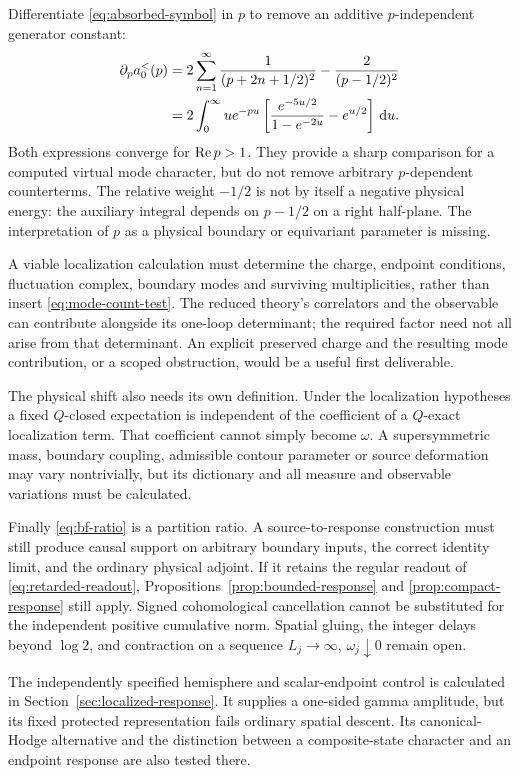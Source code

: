 Differentiate \eqref{eq:absorbed-symbol} in $p$ to remove
an additive $p$-independent generator constant:
\begin{align}\label{eq:mode-count-test}
 \partial_p a_0^{<}(p)
 &=2\sum_{n=1}^\infty\frac1{(p+2n+1/2)^2}
   -\frac2{(p-1/2)^2}\\
 &=2\int_0^\infty u e^{-pu}
 \left[\frac{e^{-5u/2}}{1-e^{-2u}}-e^{u/2}\right]\,\mathrm d u.
 \notag
\end{align}
Both expressions converge for $\operatorname{Re} p>1$. They provide a
sharp comparison for a computed virtual mode character,
but do not remove arbitrary $p$-dependent counterterms.
The relative weight $-1/2$ is not by itself a negative
physical energy: the auxiliary integral depends on
$p-1/2$ on a right half-plane. The interpretation of $p$
as a physical boundary or equivariant parameter is missing.

A viable localization calculation must determine the
charge, endpoint conditions, fluctuation complex, boundary
modes and surviving multiplicities, rather than insert
\eqref{eq:mode-count-test}. The reduced theory's correlators
and the observable can contribute alongside its one-loop
determinant; the required factor need not all arise from
that determinant. An explicit preserved charge and the
resulting mode contribution, or a scoped obstruction,
would be a useful first deliverable.

The physical shift also needs its own definition. Under
the localization hypotheses a fixed $Q$-closed expectation
is independent of the coefficient of a $Q$-exact
localization term. That coefficient cannot simply become
$\omega$. A supersymmetric mass, boundary coupling,
admissible contour parameter or source deformation may
vary nontrivially, but its dictionary and all measure and
observable variations must be calculated.

Finally \eqref{eq:bf-ratio} is a partition ratio. A
source-to-response construction must still produce causal
support on arbitrary boundary inputs, the correct identity
limit, and the ordinary physical adjoint. If it retains
the regular readout of \eqref{eq:retarded-readout},
Propositions~\ref{prop:bounded-response} and
\ref{prop:compact-response} still apply.
Signed cohomological cancellation cannot be substituted
for the independent positive cumulative norm. Spatial
gluing, the integer delays beyond $\log2$, and contraction
on a sequence $L_j\to\infty$, $\omega_j\downarrow0$
remain open.

The independently specified hemisphere and scalar-endpoint control is
calculated in Section~\ref{sec:localized-response}. It supplies a
one-sided gamma amplitude, but its fixed protected representation
fails ordinary spatial descent. Its canonical-Hodge alternative
and the distinction between a composite-state character and an
endpoint response are also tested there.
